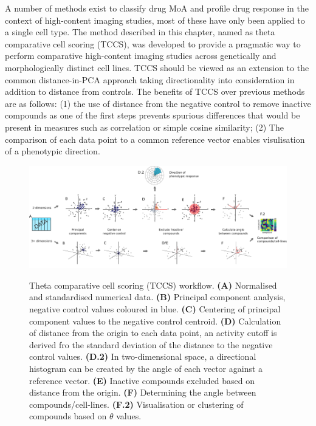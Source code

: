 \documentclass[a4paper,11pt,twoside,openright]{scrbook}
\begin{document}
A number of methods exist to classify drug MoA and profile drug response in the context of high-content imaging studies, most of these have only been applied to a single cell type.
The method described in this chapter, named as theta comparative cell scoring (TCCS), was developed to provide a pragmatic way to perform comparative high-content imaging studies across genetically and morphologically distinct cell lines.
TCCS should be viewed as an extension to the common distance-in-PCA approach taking directionality into consideration in addition to distance from controls.
The benefits of TCCS over previous methods are as follows: (1) the use of distance from the negative control to remove inactive compounds as one of the first steps prevents spurious differences that would be present in measures such as correlation or simple cosine similarity; (2) The comparison of each data point to a common reference vector enables visulisation of a phenotypic direction.


\begin{figure}
    \captionsetup{width=0.8\textwidth}
    \caption[TCCS workflow]{
Theta comparative cell scoring (TCCS) workflow.
\textbf{(A)} Normalised and standardised numerical data.
    \textbf{(B)} Principal component analysis, negative control values coloured in blue.
    \textbf{(C)} Centering of principal component values to the negative control centroid.
    \textbf{(D)} Calculation of distance from the origin to each data point, an activity cutoff is derived fro the standard deviation of the distance to the negative control values.
    \textbf{(D.2)} In two-dimensional space, a directional histogram can be created by the angle of each vector against a reference vector.
    \textbf{(E)} Inactive compounds excluded based on distance from the origin.
    \textbf{(F)} Determining the angle between compounds/cell-lines.
    \textbf{(F.2)} Visualisation or clustering of compounds based on $\theta$ values.
}
    \includegraphics[scale=1.0]{figs/ch3thetaWorkflow}
    \label{figure:theta_workflow}
\end{figure}
\end{document}
